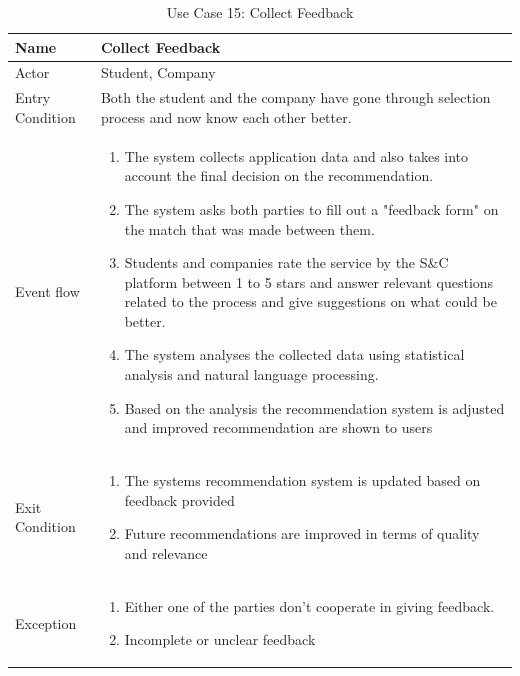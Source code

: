 \begin{table}[H]
    \centering
    \begin{tabular}{|l|p{12cm}|}
    \hline
    Name             & Collect Feedback \\ \hline
    Actor            & Student, Company  \\ \hline
    Entry Condition  & 
    Both the student and the company have gone through selection process and now know each other better. \\ \hline
    Event flow       & 
    \begin{enumerate}
        \item The system collects application data and also takes into account the final decision on the recommendation.
        \item The system asks both parties to fill out a "feedback form" on the match that was made between them.
        \item Students and companies rate the service by the S\&C platform between 1 to 5 stars and answer relevant questions related to the process and give suggestions on what could be better.
        \item The system analyses the collected data using statistical analysis and natural language processing.
        \item Based on the analysis the recommendation system is adjusted and improved recommendation are shown to users
    \end{enumerate} \\ \hline
    Exit Condition   & 
    \begin{enumerate}
        \item The systems recommendation system is updated based on feedback provided
        \item Future recommendations are improved in terms of quality and relevance
    \end{enumerate} \\ \hline
    
    Exception        & 
    \begin{enumerate}
    \item Either one of the parties don't cooperate in giving feedback. 
    \item Incomplete or unclear feedback
\end{enumerate} \\ \hline
\end{tabular}
\caption{Use Case 15: Collect Feedback}
\label{tab:user_signup}
\end{table}

